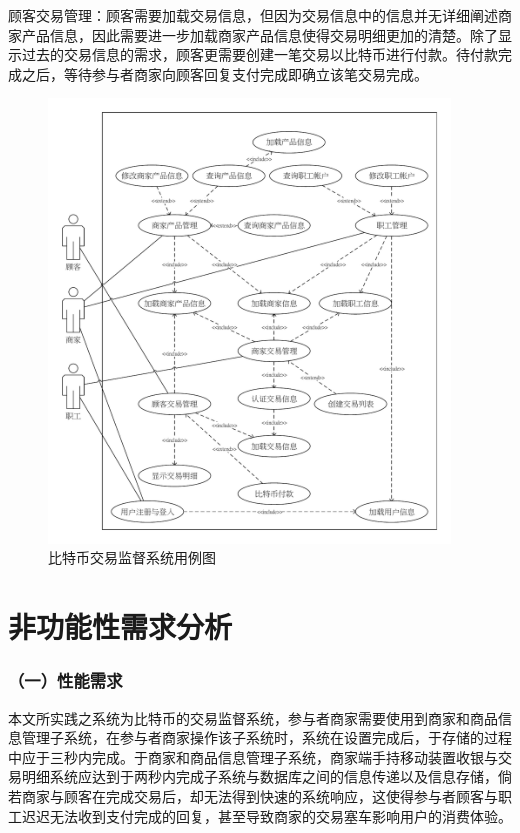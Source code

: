 顾客交易管理：顾客需要加载交易信息，但因为交易信息中的信息并无详细阐述商家产品信息，因此需要进一步加载商家产品信息使得交易明细更加的清楚。除了显示过去的交易信息的需求，顾客更需要创建一笔交易以⽐特币进⾏付款。待付款完成之后，等待参与者商家向顾客回复⽀付完成即确立该笔交易完成。

	\begin{figure}[!htb]
	\centering
	\includegraphics[width = 0.95\textwidth]{UC.pdf}
	\caption{比特币交易监督系统⽤例图}\label{UC}
	\end{figure}

	\section{非功能性需求分析}

	\subsubsection{（一）性能需求}
	
	本文所实践之系统为比特币的交易监督系统，参与者商家需要使用到商家和商品信息管理子系统，在参与者商家操作该子系统时，系统在设置完成后，于存储的过程中应于三秒内完成。于商家和商品信息管理子系统，商家端手持移动装置收银与交易明细系统应达到于两秒内完成子系统与数据库之间的信息传递以及信息存储，倘若商家与顾客在完成交易后，却无法得到快速的系统响应，这使得参与者顾客与职工迟迟无法收到⽀付完成的回复，甚至导致商家的交易塞车影响用户的消费体验。

